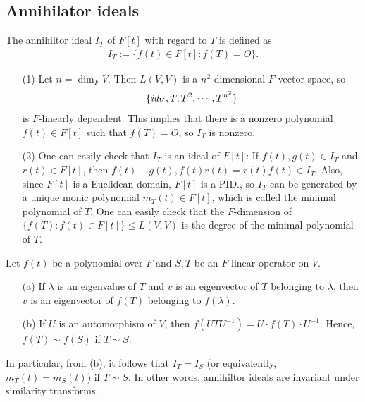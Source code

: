\subsection{Annihilator ideals}

\begin{thm}
    The annihiltor ideal $I_T$ of $F[t]$ with regard to $T$ is defined as
    \begin{align*}
        I_T:=\{f(t)\in F[t]: f(T)=O\}.
    \end{align*}
\end{thm}
\begin{rmk}
    \begin{enumerate}
        \item[(1)]
        {
            Let $n=\dim_F V$.
            Then $L(V, V)$ is a $n^2$-dimensional $F$-vector space, so
            \begin{align*}
                \{\textit{id}_{V}, T, T^2, \cdots, T^{n^2}\}
            \end{align*}
            is $F$-linearly dependent.
            This implies that there is a nonzero polynomial $f(t)\in F[t]$ such that $f(T)=O$, so $I_T$ is nonzero.
        }
        \item[(2)]
        {
            One can easily check that $I_T$ is an ideal of $F[t]$: If $f(t), g(t)\in I_T$ and $r(t)\in F[t]$, then $f(t)-g(t), f(t)r(t)=r(t)f(t)\in I_T$.
            Also, since $F[t]$ is a Euclidean domain, $F[t]$ is a PID., so $I_T$ can be generated by a \color{brown}unique \color{black} monic polynomial $m_T(t)\in F[t]$, which is called the minimal polynomial of $T$.
            \color{brown}One can easily check that the $F$-dimension of $\{f(T): f(t)\in F[t]\}\leq L(V, V)$ is the degree of the minimal polynomial of $T$. \color{black}
        }
    \end{enumerate}
\end{rmk}

\begin{obs}
    Let $f(t)$ be a polynomial over $F$ and $S, T$ be an $F$-linear operator on $V$.
    \begin{enumerate}
        \item[(a)]
        {
            If $\lambda$ is an eigenvalue of $T$ and $v$ is an eigenvector of $T$ belonging to $\lambda$, then $v$ is an eigenvector of $f(T)$ belonging to $f(\lambda)$.
        }
        \item[(b)]
        {
            If $U$ is an automorphism of $V$, then $f(UTU^{-1})=U\cdot f(T)\cdot U^{-1}$.
            Hence, $f(T)\sim f(S)$ if $T\sim S$.
        }
    \end{enumerate}
    In particular, from (b), it follows that $I_T=I_S$ (or equivalently, $m_T(t)=m_S(t)$) if $T\sim S$.
    In other words, annihiltor ideals are invariant under similarity transforms.
\end{obs}

